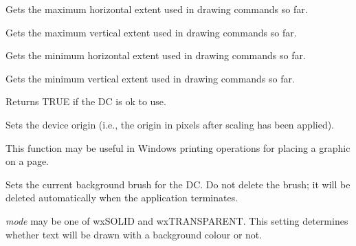 

Gets the maximum horizontal extent used in drawing commands so far.



Gets the maximum vertical extent used in drawing commands so far.



Gets the minimum horizontal extent used in drawing commands so far.



Gets the minimum vertical extent used in drawing commands so far.



Returns TRUE if the DC is ok to use.

\label{wxdcsetdeviceorigin}


Sets the device origin (i.e., the origin in pixels after scaling has been
applied).

This function may be useful in Windows printing
operations for placing a graphic on a page.

\label{wxdcsetbackground}


Sets the current background brush for the DC.  Do not delete the
brush; it will be deleted automatically when the application
terminates.

\label{wxdcsetbackgroundmode}


{\it mode} may be one of wxSOLID and wxTRANSPARENT. This setting determines
whether text will be drawn with a background colour or not.

\label{wxdcsetclippingregion}


